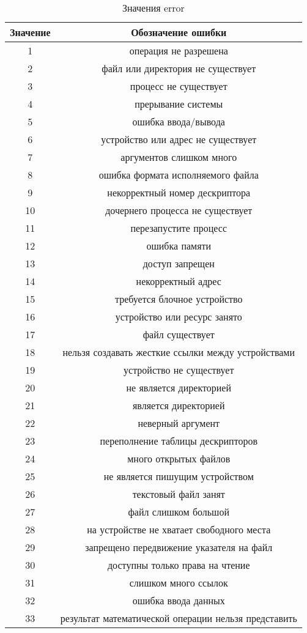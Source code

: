 \documentclass[12t]{article}
\begin{document}
\begin{center}
\begin{longtable}{|c|c|}
\caption{\label{error}Значения error}
\hline
Значение & Обозначение ошибки \\
\hline
1 & операция не разрешена \\
2 & файл или директория не существует \\
3 & процесс не существует \\
4 & прерывание системы \\
5 & ошибка ввода/вывода \\
6 & устройство или адрес не существует \\
7 & аргументов слишком много \\
8 & ошибка формата исполняемого файла \\
\hline
9 & некорректный номер дескриптора \\
10 & дочернего процесса не существует \\
11 & перезапустите процесс \\
12 & ошибка памяти \\
13 & доступ запрещен \\
14 & некорректный адрес \\
15 & требуется блочное устройство \\
16 & устройство или ресурс занято\\
17 & файл существует\\
18 & нельзя создавать жесткие ссылки между устройствами\\
19 & устройство не существует\\
20 & не является директорией\\ 
21 & является директорией\\
22 & неверный аргумент \\
23 & переполнение таблицы дескрипторов \\
24 & много открытых файлов \\
25 & не является пишущим устройством\\
26 & текстовый файл занят\\
27 & файл слишком большой \\
28 & на устройстве не хватает свободного места \\
29 & запрещено передвижение указателя на файл\\
30 & доступны только права на чтение\\
31 & слишком много ссылок\\
32 & ошибка ввода данных\\
33 & результат математической операции нельзя представить\\
\hline
\end{longtable}
\end{center}
\end{document}
